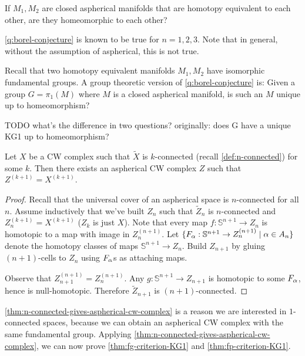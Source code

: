 \begin{question}
    \label{q:borel-conjecture}
    If \(M_1, M_2\) are closed aspherical manifolds that are homotopy equivalent to each other, are they homeomorphic to each other? 
\end{question}

\cref{q:borel-conjecture} is known to be true for \(n=1,2,3\). Note that in general, without the assumption of aspherical, this is not true.

Recall that two homotopy equivalent manifolds \(M_1, M_2\) have isomorphic fundamental groups. 
A group theoretic version of \cref{q:borel-conjecture} is: Given a group \(G=\pi_1(M)\) where \(M\) is a closed aspherical manifold, is such an  \(M\) unique up to homeomorphism?

TODO what's the difference in two questions? originally: does G have a unique KG1 up to homeomorphism?


\begin{theorem}
    \label{thm:n-connected-gives-aspherical-cw-complex}
    Let \(X\) be a CW complex such that \(\tilde X\) is \(k\)-connected (recall \cref{def:n-connected}) for some \(k\). Then there exists an aspherical CW complex \(Z\) such that \(Z^{(k+1)} = X^{(k+1)}\).
\end{theorem}

\begin{proof}
    Recall that the universal cover of an aspherical space is \(n\)-connected for all \(n\).
    Assume inductively that we've built \(Z_n\) such that \(\tilde Z_n\) is \(n\)-connected and \(Z_n^{(k+1)} = X^{(k+1)}\) (\(Z_k\) is just \(X\)). Note that every map \(f:\mathbb{S}^{n+1}\to Z_n\) is homotopic to a map with image in \(Z_n^{(n+1)}\). Let \(\{F_\alpha : \mathbb{S}^{n+1} \to Z_n^{(n+1)} \mid  \alpha \in A_n\}\) denote the homotopy classes of maps \(\mathbb{S}^{n+1}\to Z_n\). Build \(Z_{n+1}\) by gluing \((n+1)\)-cells to \(Z_n\) using  \(F_\alpha\)s as attaching maps.

    Observe that \(Z_{n+1}^{(n+1)} = Z_n^{(n+1)}\). Any \(g: \mathbb{S}^{n+1} \to Z_{n+1}\) is homotopic to some \(F_\alpha\), hence is null-homotopic. Therefore \(\tilde Z_{n+1}\) is \((n+1)\)-connected. 
\end{proof}

\cref{thm:n-connected-gives-aspherical-cw-complex} is a reason we are interested in \(1\)-connected spaces, because we can obtain an aspherical CW complex with the same fundamental group. Applying \cref{thm:n-connected-gives-aspherical-cw-complex}, we can now prove \cref{thm:fg-criterion-KG1} and \cref{thm:fp-criterion-KG1}.


